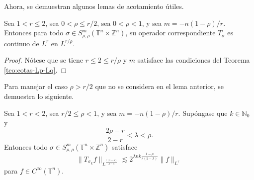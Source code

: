 Ahora, se demuestran algunos lemas de acotamiento útiles.
\begin{lemma}
	Sea $1 < r \leq 2$, sea $0<\rho\leq r/2$, sea $0<\rho<1$, y sea $m = -n(1-\rho)/r$. Entonces para todo $\sigma \in S^m_{\rho,\rho}(\mathbb{T}^n \times \mathbb{Z}^n) $, su operador correspondiente $T_\sigma$ es continuo de $L^r$ en $L^{r/\rho}$.
	\label{lem:Lr-Lr/rho-boundedness}
\end{lemma}
\begin{proof}
	Nótese que se tiene $r\leq 2 \leq r/\rho$ y $m$ satisface las condiciones del Teorema \ref{teo:cotas-Lp-Lq}.
\end{proof}
Para manejar el caso $\rho > r/2$ que no se considera en el lema anterior, se demuestra lo siguiente.
\begin{lemma}
	Sea $1<r<2$, sea $r/2\leq\rho<1$, y sea $m=-n(1-\rho)/r$. Supóngase que $k\in\mathbb{N}_0$ y 
	\begin{equation*}
		\frac{2\rho-r}{2-r} < \lambda < \rho.
	\end{equation*}
	Entonces todo $\sigma \in S^m_{\rho,\rho}(\mathbb{T}^n \times \mathbb{Z}^n) $ satisface 
	\begin{equation*}
		\|T_{\sigma_k}f\|_{L^{\frac{r(1-\lambda)}{\rho-\lambda}} } \lesssim 2^{\lambda nk \frac{1-\rho}{r(1-\lambda)}} \|f\|_{L^r}
	\end{equation*}
	para $f\in C^\infty(\mathbb{T}^n)$.
	\label{lem:Lr-lambda-boundedness}
\end{lemma}

